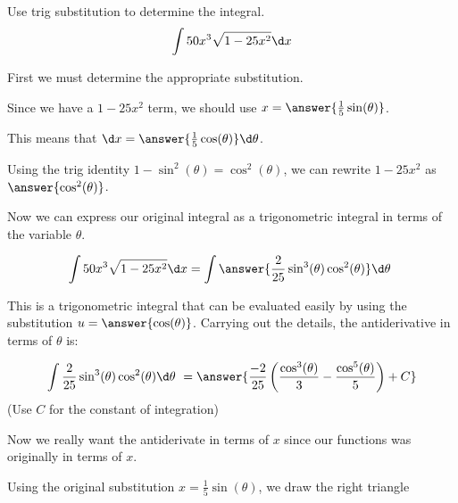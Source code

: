 \documentclass{ximera}
\author{Jason Miller}
\begin{document}
\begin{exercise}
Use trig substitution to determine the integral.
\[
\int 50 x^{3} \sqrt{1-25x^{2}} \d x
\]

First we must determine the appropriate substitution. 

Since we have a $1-25x^{2}$ term, we should use $x=\answer{\frac{1}{5}\sin(\theta)}$. 

This means that $\d x= \answer{\frac{1}{5}\cos(\theta)} \d \theta$. 

\begin{exercise}
Using the trig identity $1-\sin^{2}(\theta)=\cos^{2}(\theta)$, we can rewrite $1-25x^{2}$ as $\answer{\cos^{2}(\theta)}$. 

Now we can express our original integral as a trigonometric integral in terms of the variable $\theta$. 

\[
\int  50 x^{3} \sqrt{1-25x^{2}} \d x= \int \answer{  \frac{2}{25} \sin^{3}(\theta) \cos^{2}(\theta)  } \d \theta\
\]

This is a trigonometric integral that can be evaluated easily by using the substitution $u = \answer{\cos(\theta)}$.  Carrying out the details, the antiderivative in terms of $\theta$ is: 

\[
\int \frac{2}{25} \sin^{3}(\theta) \cos^{2}(\theta)   \d \theta\ = \answer{ \frac{-2}{25}\left( \frac{\cos^{3}(\theta)}{3} -\frac{\cos^{5}(\theta)}{5} \right) + C}
\]
(Use $C$ for the constant of integration)


Now we really want the antiderivate in terms of $x$ since our functions was originally in terms of $x$. 

\begin{exercise}
Using the original substitution $x=\frac{1}{5}\sin(\theta)$, we draw the right triangle 

    \begin{image}
    \end{image}


\end{exercise}
\end{exercise}
\end{exercise}
\end{document}

